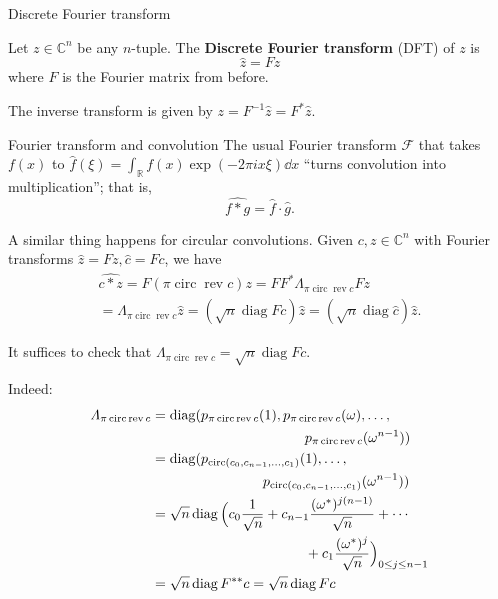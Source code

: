 \documentclass[mathserif
, handout
]{beamer}
\DeclareMathOperator{\Circ}{circ}
\DeclareMathOperator{\diag}{diag}
\DeclareMathOperator{\rev}{rev}
\begin{document}
\begin{frame}{Discrete Fourier transform}    
    \begin{definition}
        Let $z \in \mathbb C^n$ be any $n$-tuple. The \textbf{Discrete Fourier transform} (DFT) of $z$ is 
    \[\hat z = Fz\] where $F$ is the Fourier matrix from before.
    \end{definition} The inverse transform is given by $z = F^{-1}\hat z = F^\ast\hat z$.
\end{frame}

\begin{frame}{Fourier transform and convolution}
    The usual Fourier transform $\mathcal F$ that takes $f(x)$ to $\hat f(\xi) = \int_\mathbb R f(x)\exp(-2\pi i x \xi)\dd x$ ``turns convolution into multiplication''; that is,
    \[\widehat{f\ast g} = \hat f\cdot \hat g.\]
    
    A similar thing happens for circular convolutions. Given $c,z\in\mathbb C^n$ with Fourier transforms $\hat z = Fz, \hat c = Fc$, we have
    \begin{multline*}
        \widehat{c\ast z} = F(\pi \Circ \rev c)z = FF^\ast\varLambda_{\pi \Circ \rev c}Fz \\ = \varLambda_{\pi \Circ \rev c}\hat z=(\sqrt{n}\diag F c)\hat z = (\sqrt{n}\diag \hat c)\hat z.
    \end{multline*}
\end{frame}

\begin{frame}{}
    It suffices to check that $\varLambda_{\pi \Circ \rev c} = \sqrt{n}\diag F c$.
    \begin{block}{Indeed:}\vspace*{-1.5em}
        \begin{align*}
            \varLambda_{\pi \Circ \rev c} &= \diag(p_{\pi \Circ \rev c}(1),p_{\pi \Circ \rev c}(\omega),\dots,\\
            &\hspace*{11em}p_{\pi \Circ \rev c}(\omega^{n-1}))\\
            &= \diag(p_{\Circ(c_0,c_{n-1},\dots,c_1)}(1),\dots,\\
            &\hspace*{8em}p_{\Circ(c_0,c_{n-1},\dots,c_1)}(\omega^{n-1}))\\
            &= \sqrt{n}\diag\Big(c_0\frac{1}{\sqrt{n}}+c_{n-1}\frac{(\omega^\ast)^{j(n-1)}}{\sqrt{n}}+\cdots\\
            &\hspace*{11em} +c_1\frac{(\omega^\ast)^j}{\sqrt{n}}\Big)_{0\leq j \leq n-1}\\
            &= \sqrt{n}\diag F^{\ast\ast}c = \sqrt{n}\diag Fc
        \end{align*}
    \end{block}
\end{frame}
\end{document}
